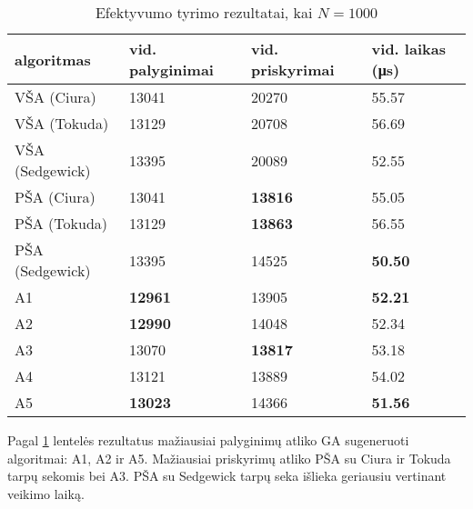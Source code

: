 \documentclass{VUMIFInfKursinis}
\begin{document}
\begin{table}[H]
  \caption{Efektyvumo tyrimo rezultatai, kai $N = 1000$}
  \label{results_1000}
  \centering
  \begin{tabular}{@{}llll@{}}
  algoritmas & vid. palyginimai                       & vid. priskyrimai                       & vid. laikas (μs)                       \\ \midrule
  VŠA (Ciura)       & 13041                                  & 20270                                  & 55.57                                  \\
  VŠA (Tokuda)      & 13129                                  & 20708                                  & 56.69                                  \\
  VŠA (Sedgewick)       & 13395                                  & 20089                                  & 52.55                                  \\
  PŠA (Ciura)      & 13041                                  & \cellcolor[HTML]{70AD47}\textbf{13816} & 55.05                                  \\
  PŠA (Tokuda)      & 13129                                  & \cellcolor[HTML]{70AD47}\textbf{13863} & 56.55                                  \\
  PŠA (Sedgewick)      & 13395                                  & 14525                                  & \cellcolor[HTML]{70AD47}\textbf{50.50} \\
  A1      & \cellcolor[HTML]{70AD47}\textbf{12961} & 13905                                  & \cellcolor[HTML]{70AD47}\textbf{52.21} \\
  A2      & \cellcolor[HTML]{70AD47}\textbf{12990} & 14048                                  & 52.34                                  \\
  A3      & 13070                                  & \cellcolor[HTML]{70AD47}\textbf{13817} & 53.18                                  \\
  A4      & 13121                                  & 13889                                  & 54.02                                  \\
  A5      & \cellcolor[HTML]{70AD47}\textbf{13023} & 14366                                  & \cellcolor[HTML]{70AD47}\textbf{51.56} \\ \bottomrule
  \end{tabular}
\end{table}

Pagal \ref{results_1000} lentelės rezultatus
mažiausiai palyginimų atliko GA sugeneruoti algoritmai: A1, A2 ir A5.
Mažiausiai priskyrimų atliko PŠA su Ciura ir Tokuda tarpų sekomis bei A3.
PŠA su Sedgewick tarpų seka išlieka geriausiu vertinant veikimo laiką.
\end{document}
